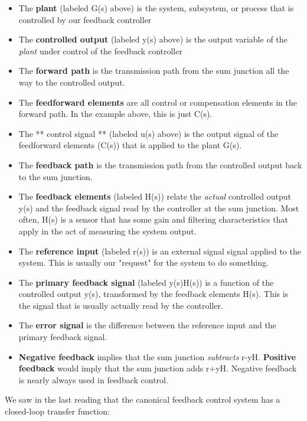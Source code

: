 \documentclass[11pt]{article}
\providecommand{\tightlist}{%
      \setlength{\itemsep}{0pt}\setlength{\parskip}{0pt}}
\begin{document}
\begin{itemize}
\tightlist
\item
  The \textbf{plant} (labeled G(s) above) is the system, subsystem, or
  process that is controlled by our feedback controller
\item
  The \textbf{controlled output} (labeled y(s) above) is the output
  variable of the \emph{plant} under control of the feedback controller
\item
  The \textbf{forward path} is the transmission path from the sum
  junction all the way to the controlled output.
\item
  The \textbf{feedforward elements} are all control or compensation
  elements in the forward path. In the example above, this is just C(s).
\item
  The ** control signal ** (labeled u(s) above) is the output signal of
  the feedforward elements (C(s)) that is applied to the plant G(s).
\item
  The \textbf{feedback path} is the transmission path from the
  controlled output back to the sum junction.
\item
  The \textbf{feedback elements} (labeled H(s)) relate the \emph{actual}
  controlled output y(s) and the feedback signal read by the controller
  at the sum junction. Most often, H(s) is a sensor that has some gain
  and filtering characteristics that apply in the act of measuring the
  system output.
\item
  The \textbf{reference input} (labeled r(s)) is an external signal
  signal applied to the system. This is usually our "request" for the
  system to do something.
\item
  The \textbf{primary feedback signal} (labeled y(s)H(s)) is a function
  of the controlled output y(s), transformed by the feedback elements
  H(s). This is the signal that is usually actually read by the
  controller.
\item
  The \textbf{error signal} is the difference between the reference
  input and the primary feedback signal.
\item
  \textbf{Negative feedback} implies that the sum junction
  \emph{subtracts} r-yH. \textbf{Positive feedback} would imply that the
  sum junction adds r+yH. Negative feedback is nearly always used in
  feedback control.
\end{itemize}

We saw in the last reading that the canonical feedback control system
has a closed-loop transfer function:
\end{document}
